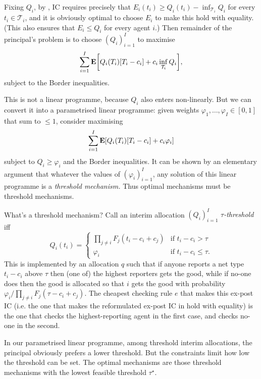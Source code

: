 Fixing $Q_i$, by ,
IC requires precisely that $E_i(t_i) \geq Q_i(t_i) - \inf_{\mathcal{T}_i} Q_i$ for every $t_i \in \mathcal{T}_i$,
and it is obviously optimal to choose $E_i$ to make this hold with equality.
(This also ensures that $E_i \leq Q_i$ for every agent $i$.)
Then remainder of the principal's problem is to choose $(Q_i)_{i=1}^I$ to maximise
%
\begin{equation*}
	\sum_{i=1}^I \E \left[ Q_i(T_i) [T_i-c_i]
	+ c_i \inf_{\mathcal{T}_i} Q_i \right] ,
\end{equation*}
%
subject to the Border inequalities.

This is not a linear programme, because $Q_i$ also enters non-linearly.
But we can convert it into a parametrised linear programme:
given weights $\varphi_1,\dots,\varphi_I \in [0,1]$ that sum to $\leq 1$, consider maximising
%
\begin{equation*}
	\sum_{i=1}^I \E \left[ Q_i(T_i) [T_i-c_i]
	+ c_i \varphi_i \right] 
\end{equation*}
%
subject to $Q_i \geq \varphi_i$ and the Border inequalities.
It can be shown by an elementary argument \parencite[see][]{ErlansonKleiner2019} that whatever the values of $(\varphi_i)_{i=1}^I$, any solution of this linear programme is a \emph{threshold mechanism.}
Thus optimal mechanisms must be threshold mechanisms.

What's a threshold mechanism?
Call an interim allocation $(Q_i)_{i=1}^I$
\emph{$\tau$-threshold} iff
%
\begin{equation*}
	Q_i(t_i) =
	\begin{cases}
		\prod_{j \neq i} F_j(t_i-c_i+c_j)
		& \text{if $t_i-c_i > \tau$} \\
		\varphi_i
		& \text{if $t_i-c_i \leq \tau$.} 
	\end{cases}
\end{equation*}
%
This is implemented by an allocation $q$
such that if anyone reports a net type $t_i-c_i$ above $\tau$ then (one of) the highest reporters gets the good,
while if no-one does then the good is allocated so that $i$ gets the good with probability $\varphi_i / \prod_{j \neq i} F_j(\tau-c_i+c_j)$.
The cheapest checking rule $e$ that makes this ex-post IC (i.e. the one that makes the reformulated ex-post IC in  hold with equality) is the one that checks the highest-reporting agent in the first case, and checks no-one in the second.

In our parametrised linear programme, among threshold interim allocations, the principal obviously prefers a lower threshold.
But the constraints limit how low the threshold can be set.
The optimal mechanisms are those threshold mechanisms with the lowest feasible threshold $\tau^\star$.

